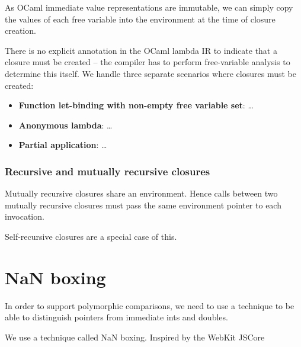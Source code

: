 \documentclass[12pt,a4paper,twoside,openright]{report}
\begin{document}
As OCaml immediate value representations are immutable, we can simply copy the
values of each free variable into the environment at the time of closure
creation.

There is no explicit annotation in the OCaml lambda IR to indicate that a
closure must be created -- the compiler has to perform free-variable analysis
to determine this itself. We handle three separate scenarios where closures
must be created:

\begin{itemize}
    \item \textbf{Function let-binding with non-empty free variable set}:
        \ldots
    \item \textbf{Anonymous lambda}:
        \ldots
    \item \textbf{Partial application}:
        \ldots
\end{itemize}

\subsubsection{Recursive and mutually recursive closures}

Mutually recursive closures share an environment. Hence calls between two
mutually recursive closures must pass the same environment pointer to each
invocation.

Self-recursive closures are a special case of this.


\section{NaN boxing}

In order to support polymorphic comparisons, we need to use a technique to be
able to distinguish pointers from immediate ints and doubles.

We use a technique called NaN boxing. Inspired by the WebKit JSCore
\end{document}
